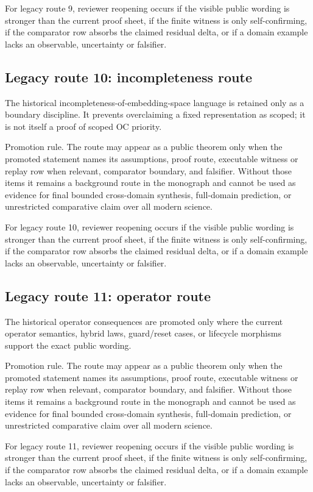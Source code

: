 For legacy route 9, reviewer reopening occurs if the visible public wording is stronger than the current proof sheet, if the finite witness is only self-confirming, if the comparator row absorbs the claimed residual delta, or if a domain example lacks an observable, uncertainty or falsifier.


\subsection{Legacy route 10: incompleteness route}

The historical incompleteness-of-embedding-space language is retained only as a boundary discipline. It prevents overclaiming a fixed representation as scoped; it is not itself a proof of scoped OC priority.


Promotion rule. The route may appear as a public theorem only when the promoted statement names its assumptions, proof route, executable witness or replay row when relevant, comparator boundary, and falsifier. Without those items it remains a background route in the monograph and cannot be used as evidence for final bounded cross-domain synthesis, full-domain prediction, or unrestricted comparative claim over all modern science.


For legacy route 10, reviewer reopening occurs if the visible public wording is stronger than the current proof sheet, if the finite witness is only self-confirming, if the comparator row absorbs the claimed residual delta, or if a domain example lacks an observable, uncertainty or falsifier.


\subsection{Legacy route 11: operator route}

The historical operator consequences are promoted only where the current operator semantics, hybrid laws, guard/reset cases, or lifecycle morphisms support the exact public wording.


Promotion rule. The route may appear as a public theorem only when the promoted statement names its assumptions, proof route, executable witness or replay row when relevant, comparator boundary, and falsifier. Without those items it remains a background route in the monograph and cannot be used as evidence for final bounded cross-domain synthesis, full-domain prediction, or unrestricted comparative claim over all modern science.


For legacy route 11, reviewer reopening occurs if the visible public wording is stronger than the current proof sheet, if the finite witness is only self-confirming, if the comparator row absorbs the claimed residual delta, or if a domain example lacks an observable, uncertainty or falsifier.


